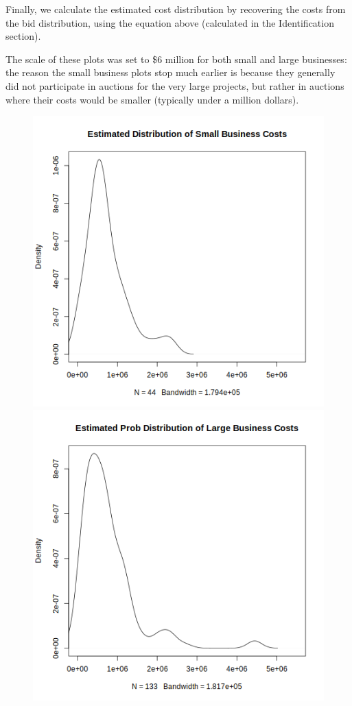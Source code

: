 Finally, we calculate the estimated cost distribution by recovering the costs from the bid distribution,
using the equation above (calculated in the Identification section).


The scale of these plots was set to \$6 million for both small and large
businesses: the reason the small business plots stop much earlier is because
they generally did not participate in auctions for the very large projects,
but rather in auctions where their costs would be smaller (typically under
a million dollars).

\begin{figure}[ht!]
\includegraphics[scale=0.5]{imgs/f_s.png}
\includegraphics[scale=0.5]{imgs/f_l.png}

\end{figure}
